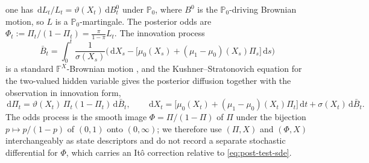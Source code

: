 \documentclass[pdflatex,sn-mathphys-num]{sn-jnl}
\theoremstyle{plain}
\theoremstyle{definition}
\newcommand{\PR}{\mathbb{P}}
\newcommand{\Filt}{\mathbb{F}}
\newcommand{\dd}{\,\mathrm{d}}
\newcommand{\snr}{\vartheta}
\newcommand{\post}{\Pi}
\newcommand{\odds}{\Phi}
\newcommand{\bbar}{\bar{B}}
\begin{document}
one has $\dd L_t/L_t=\snr(X_t)\dd B_t^0$ under $\PR_0$, where $B^0$ is the
$\PR_0$-driving Brownian motion, so $L$ is a $\PR_0$-martingale. The posterior
odds are $\odds_t:=\post_t/(1-\post_t)=\tfrac{\pi}{1-\pi}L_t$. 
The innovation process
\begin{equation}\label{eq:innov}
  \bbar_t=\int_0^t\frac{1}{\sigma(X_s)}\Big(\dd X_s
    -\big[\mu_0(X_s)+(\mu_1-\mu_0)(X_s)\post_s\big]\dd s\Big)
\end{equation}
is a standard $\Filt^X$-Brownian motion \citep{liptser1977statistics}, and the
Kushner--Stratonovich equation for the two-valued hidden variable gives the
posterior diffusion together with the observation in innovation form,
\begin{equation}\label{eq:post-test-sde}
  \dd\post_t=\snr(X_t)\,\post_t(1-\post_t)\dd\bbar_t,\qquad
  \dd X_t=\big[\mu_0(X_t)+(\mu_1-\mu_0)(X_t)\post_t\big]\dd t+\sigma(X_t)\dd\bbar_t.
\end{equation}
The odds process is the smooth image $\odds=\post/(1-\post)$ of $\post$ under the
bijection $p\mapsto p/(1-p)$ of $(0,1)$ onto $(0,\infty)$; we therefore use
$(\post,X)$ and $(\odds,X)$ interchangeably as state descriptors and do not record
a separate stochastic differential for $\odds$, which carries an It\^o correction
relative to \eqref{eq:post-test-sde}.
\end{document}
